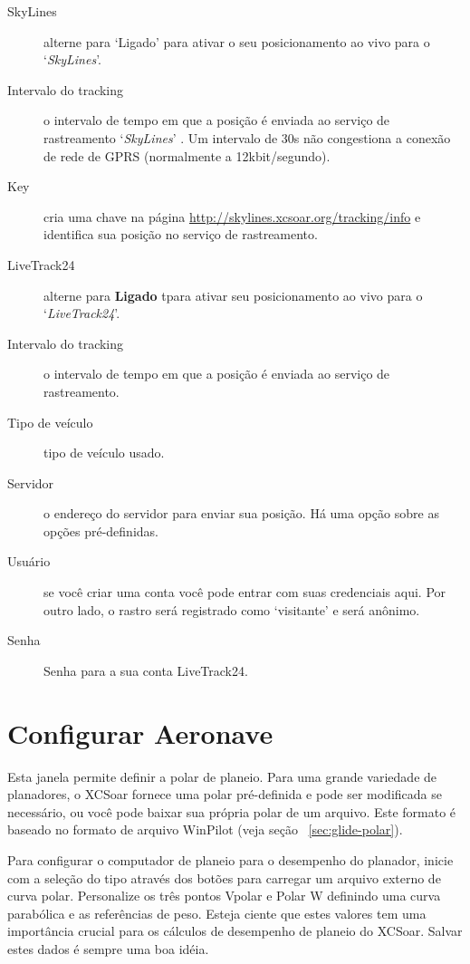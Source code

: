 \begin{description}
\item[SkyLines]  alterne para ‘Ligado’ para ativar o seu posicionamento ao vivo para o `{\em SkyLines}'.
\item[Intervalo do tracking]  o intervalo de tempo em que a posição é enviada ao serviço de rastreamento  `{\em SkyLines}' .  Um intervalo de 30s não congestiona a conexão de rede de GPRS (normalmente a 12kbit/segundo).
\item[Key]  cria uma chave na página  \url{http://skylines.xcsoar.org/tracking/info} 
   e identifica sua posição no serviço de rastreamento.
\\
\item[LiveTrack24]  alterne para  {\bf Ligado} tpara ativar seu posicionamento ao vivo para o `{\em LiveTrack24}'.
\item[Intervalo do tracking]  o intervalo de tempo em que a posição é enviada ao serviço de rastreamento.
\item[Tipo de veículo] tipo de veículo usado.
\item[Servidor]  o endereço do servidor para enviar sua posição.  Há uma opção sobre as opções pré-definidas.
\item[Usuário]  se você criar uma conta você pode entrar com suas credenciais aqui.  Por outro lado, o rastro será registrado como ‘visitante’ e será anônimo.
\item[Senha]  Senha para a sua conta LiveTrack24.
\end{description}


\section{Configurar Aeronave}

Esta janela permite definir a polar de planeio.  Para uma grande variedade 
de planadores, o XCSoar fornece uma polar pré-definida e pode ser modificada se necessário, ou você pode baixar sua própria polar de um arquivo.  Este formato é baseado no formato de arquivo WinPilot (veja seção ~\ref{sec:glide-polar}).

\label{conf:polar} Para configurar o computador de planeio para o desempenho do planador, inicie com a seleção do tipo através dos botões     para carregar um arquivo externo de curva polar.
Personalize os três pontos Vpolar e Polar W definindo uma curva parabólica e as referências de peso.  Esteja ciente que estes valores tem uma importância crucial para os cálculos de desempenho de planeio do XCSoar.  \tip Salvar estes dados é sempre uma boa idéia.

